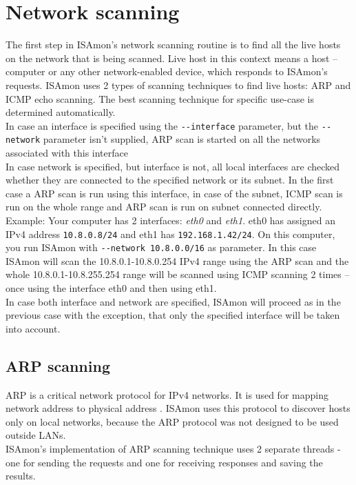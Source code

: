 \documentclass[11pt,a4paper]{article}
\begin{document}
\section{Network scanning}
	The first step in ISAmon's network scanning routine is to find all the live hosts on the network that is being scanned. Live host in this context means a host -- computer or any other network-enabled device, which responds to ISAmon's requests. ISAmon uses 2 types of scanning techniques to find live hosts: ARP and ICMP echo scanning. The best scanning technique for specific use-case is determined automatically.\\
	In case an interface is specified using the \texttt{-{}-interface} parameter, but the \texttt{-{}-network} parameter isn't supplied, ARP scan is started on all the networks associated with this interface\\
	In case network is specified, but interface is not, all local interfaces are checked whether they are connected to the specified network or its subnet. In the first case a ARP scan is run using this interface, in case of the subnet, ICMP scan is run on the whole range and ARP scan is run on subnet connected directly. Example: Your computer has 2 interfaces: \emph{eth0} and \emph{eth1}. eth0 has assigned an IPv4 address \texttt{10.8.0.8/24} and eth1 has \texttt{192.168.1.42/24}. On this computer, you run ISAmon with \texttt{-{}-network 10.8.0.0/16} as parameter. In this case ISAmon will scan the 10.8.0.1-10.8.0.254 IPv4 range using the ARP scan and the whole 10.8.0.1-10.8.255.254 range will be scanned using ICMP scanning 2 times -- once using the interface eth0 and then using eth1.\\
	In case both interface and network are specified, ISAmon will proceed as in the previous case with the exception, that only the specified interface will be taken into account.

	\subsection{ARP scanning}
		ARP is a critical network protocol for IPv4 networks. It is used for mapping network address to physical address \cite{RFC0826}\cite{Wiki:ARP}. ISAmon uses this protocol to discover hosts only on local networks, because the ARP protocol was not designed to be used outside LANs.\\
		ISAmon's implementation of ARP scanning technique uses 2 separate threads - one for sending the requests and one for receiving responses and saving the results.\\
\end{document}
